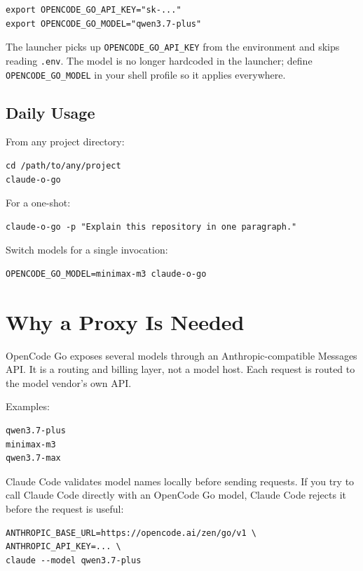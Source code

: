 \documentclass[11pt,a4paper]{article}
\newcommand{\code}[1]{\texttt{#1}}
\begin{document}
\begin{verbatim}
export OPENCODE_GO_API_KEY="sk-..."
export OPENCODE_GO_MODEL="qwen3.7-plus"
\end{verbatim}

The launcher picks up \code{OPENCODE\_GO\_API\_KEY} from the environment and
skips reading \code{.env}. The model is no longer hardcoded in the launcher;
define \code{OPENCODE\_GO\_MODEL} in your shell profile so it applies
everywhere.

\subsection{Daily Usage}

From any project directory:

\begin{verbatim}
cd /path/to/any/project
claude-o-go
\end{verbatim}

For a one-shot:

\begin{verbatim}
claude-o-go -p "Explain this repository in one paragraph."
\end{verbatim}

Switch models for a single invocation:

\begin{verbatim}
OPENCODE_GO_MODEL=minimax-m3 claude-o-go
\end{verbatim}

\section{Why a Proxy Is Needed}

OpenCode Go exposes several models through an Anthropic-compatible Messages API.
It is a routing and billing layer, not a model host. Each request is routed to
the model vendor's own API.

Examples:

\begin{verbatim}
qwen3.7-plus
minimax-m3
qwen3.7-max
\end{verbatim}

Claude Code validates model names locally before sending requests. If you try
to call Claude Code directly with an OpenCode Go model, Claude Code rejects it
before the request is useful:

\begin{verbatim}
ANTHROPIC_BASE_URL=https://opencode.ai/zen/go/v1 \
ANTHROPIC_API_KEY=... \
claude --model qwen3.7-plus
\end{verbatim}
\end{document}
